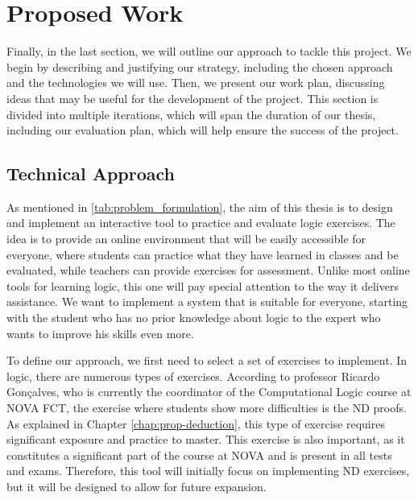 %

\chapter{Proposed Work}
\label{chap:work}
Finally, in the last section, we will outline our approach to tackle this project. We begin by describing and justifying our strategy, including the chosen approach and the technologies we will use. Then, we present our work plan, discussing ideas that may be useful for the development of the project. This section is divided into multiple iterations, which will span the duration of our thesis, including our evaluation plan, which will help ensure the success of the project.

\section{Technical Approach}
As mentioned in \ref{tab:problem_formulation}, the aim of this thesis is to design and implement an interactive tool to practice and evaluate logic exercises. The idea is to provide an online environment that will be easily accessible for everyone, where students can practice what they have learned in classes and be evaluated, while teachers can provide exercises for assessment. Unlike most online tools for learning logic, this one will pay special attention to the way it delivers assistance. We want to implement a system that is suitable for everyone, starting with the student who has no prior knowledge about logic to the expert who wants to improve his skills even more. 

To define our approach, we first need to select a set of exercises to implement. In logic, there are numerous types of exercises. According to professor Ricardo Gonçalves, who is currently the coordinator of the Computational Logic course at NOVA FCT, the exercise where students show more difficulties is the \gls{ND} proofs. As explained in Chapter \ref{chap:prop-deduction}, this type of exercise requires significant exposure and practice to master. This exercise is also important, as it constitutes a significant part of the course at NOVA and is present in all tests and exams. Therefore, this tool will initially focus on implementing \gls{ND} exercises, but it will be designed to allow for future expansion. 

